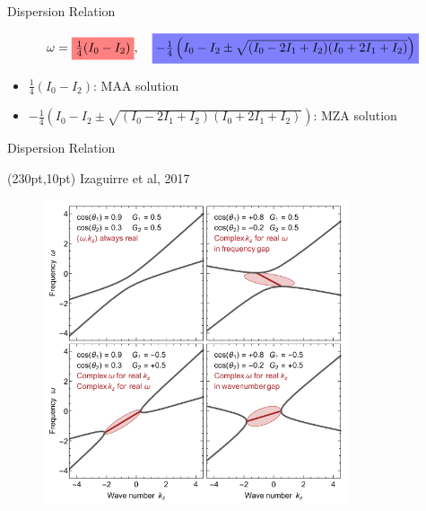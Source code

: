 \documentclass[9pt]{beamer}
\begin{document}
\begin{darkframes}
\begin{frame}{Dispersion Relation}
    \begin{tcolorbox}
        \vspace{-0.8em}
        \begin{equation*}
       \omega =\colorbox{red!50}{$\frac{1}{4}(I_0-I_2)$}, \quad \colorbox{blue!50}{$-\frac{1}{4}\left(I_0-I_2\pm \sqrt{ (I_0-2I_1+I_2)(I_0+2I_1+I_2) }\right)$}
        \end{equation*}
        \end{tcolorbox}
\begin{itemize}
    \item \colorbox{red!50}{$\frac{1}{4}(I_0-I_2)$}: MAA solution
    \item \colorbox{blue!50}{$-\frac{1}{4}\left(I_0-I_2\pm \sqrt{ (I_0-2I_1+I_2)(I_0+2I_1+I_2) }\right)$}: MZA solution
\end{itemize}

\end{frame}

\begin{frame}{Dispersion Relation}


    \begin{textblock*}{100pt}(230pt,10pt)
        Izaguirre et al, 2017
    \end{textblock*}

\begin{figure}
    \begin{tcolorbox}
        \color{white}
    \centering
    \includegraphics[width=0.8\textwidth]{assets/dr/dr-two-beams.png}
    \end{tcolorbox}


\end{figure}
\end{frame}
\end{darkframes}
\end{document}
